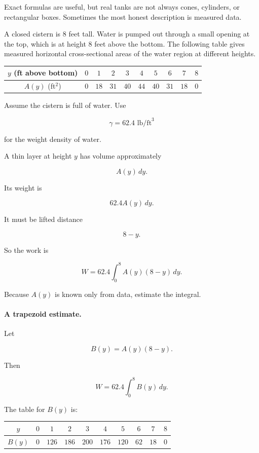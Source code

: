 Exact formulas are useful, but real tanks are not always cones, cylinders, or rectangular
boxes.  Sometimes the most honest description is measured data.

A closed cistern is \(8\) feet tall.  Water is pumped out through a small opening at the top,
which is at height \(8\) feet above the bottom.  The following table gives measured
horizontal cross-sectional areas of the water region at different heights.

\begin{center}
\begin{tabular}{c|ccccccccc}
\(y\) (ft above bottom) & \(0\) & \(1\) & \(2\) & \(3\) & \(4\) & \(5\) & \(6\) & \(7\) & \(8\) \\ \hline
\(A(y)\) (ft\(^2\)) & \(0\) & \(18\) & \(31\) & \(40\) & \(44\) & \(40\) & \(31\) & \(18\) & \(0\)
\end{tabular}
\end{center}

Assume the cistern is full of water.  Use

\[
\gamma=62.4\text{ lb/ft}^3
\]

for the weight density of water.

A thin layer at height \(y\) has volume approximately

\[
A(y)\,dy.
\]

Its weight is

\[
62.4A(y)\,dy.
\]

It must be lifted distance

\[
8-y.
\]

So the work is

\[
\boxed{
W=62.4\int_0^8 A(y)(8-y)\,dy.
}
\]

Because \(A(y)\) is known only from data, estimate the integral.

\paragraph{A trapezoid estimate.}
Let

\[
B(y)=A(y)(8-y).
\]

Then

\[
W=62.4\int_0^8 B(y)\,dy.
\]

The table for \(B(y)\) is:

\begin{center}
\begin{tabular}{c|ccccccccc}
\(y\) & \(0\) & \(1\) & \(2\) & \(3\) & \(4\) & \(5\) & \(6\) & \(7\) & \(8\) \\ \hline
\(B(y)\) & \(0\) & \(126\) & \(186\) & \(200\) & \(176\) & \(120\) & \(62\) & \(18\) & \(0\)
\end{tabular}
\end{center}

